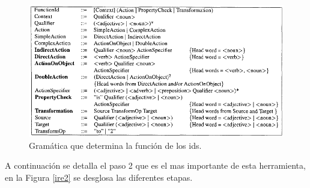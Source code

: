 \documentclass[a4paper,12pt]{report}
\begin{document}
\begin{figure}[t] %
\centering
\includegraphics[scale= 0.70]{./ire_3.png}
\caption{Gramática que determina la función de los ids.}
\label{ire3}
\end{figure}

A continuación se detalla el paso 2 que es el mas importante de esta herramienta, en la Figura \ref{ire2} se desglosa las diferentes etapas.
\end{document}
